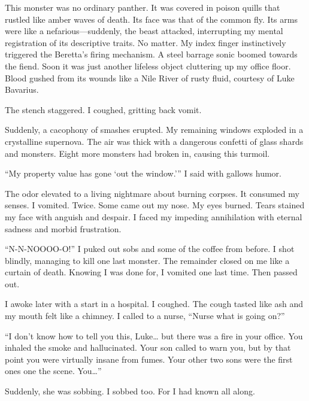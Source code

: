This monster was no ordinary panther. It was covered in poison
quills that rustled like amber waves of death. Its face was that of
the common fly. Its arms were like a nefarious---suddenly, the
beast attacked, interrupting my mental registration of its
descriptive traits. No matter. My index finger instinctively
triggered the Beretta's firing mechanism. A steel barrage
sonic boomed towards the fiend. Soon it was just another lifeless
object cluttering up my office floor. Blood gushed from its wounds
like a Nile River of rusty fluid, courtesy of Luke Bavarius.



The stench staggered. I coughed, gritting back vomit.



Suddenly, a cacophony of smashes erupted. My remaining windows
exploded in a crystalline supernova. The air was thick with a
dangerous confetti of glass shards and monsters. Eight more
monsters had broken in, causing this turmoil.



``My property value has gone `out the
window.''' I said with gallows humor.



The odor elevated to a living nightmare about burning corpses. It
consumed my senses. I vomited. Twice. Some came out my nose. My
eyes burned. Tears stained my face with anguish and despair. I
faced my impeding annihilation with eternal sadness and morbid
frustration.



``N-N-NOOOO-O!'' I puked out sobs and some of the coffee
from before. I shot blindly, managing to kill one last monster. The
remainder closed on me like a curtain of death. Knowing I was done
for, I vomited one last time. Then passed out.



I awoke later with a start in a hospital. I coughed. The cough
tasted like ash and my mouth felt like a chimney. I called to a
nurse, ``Nurse what is going on?''



``I don't know how to tell you this, Luke{\ldots} but
there was a fire in your office. You inhaled the smoke and
hallucinated. Your son called to warn you, but by that point you
were virtually insane from fumes. Your other two sons were the
first ones one the scene. You{\ldots}''



Suddenly, she was sobbing. I sobbed too. For I had known all
along.



